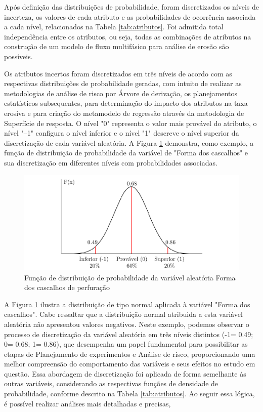 Após definição das distribuições de probabilidade, foram discretizados os níveis de incerteza, os valores de cada atributo e as probabilidades de ocorrência associada a cada nível, relacionados na Tabela \ref{tab:atributos}. Foi admitida total independência entre os atributos, ou seja, todas as combinações de atributos na construção de um modelo de fluxo multifásico para análise de erosão são possíveis.

 Os atributos incertos foram discretizados em três níveis de acordo com as respectivas distribuições de probabilidade geradas, com intuito de realizar as metodologias de análise de risco por Árvore de derivação, os planejamentos estatísticos subsequentes, para determinação do impacto dos atributos na taxa erosiva e para criação do metamodelo de regressão através da metodologia de Superfície de resposta. O nível "0" representa o valor mais provável do atributo, o nível "–1" configura o nível inferior e o nível "1" descreve o nível superior da discretização de cada variável aleatória. A Figura \ref{fig:discretizacao} demonstra, como exemplo, a função de distribuição de probabilidade da variável de "Forma dos cascalhos" e sua discretização em diferentes níveis com probabilidades associadas.

\begin{figure}[H] 
    \centering  
    \includegraphics{Figuras/discretizacao.pdf}  
    \caption{Função de distribuição de probabilidade da variável aleatória Forma dos cascalhos de perfuração}  
    \label{fig:discretizacao}  
\end{figure}

A Figura \ref{fig:discretizacao} ilustra a distribuição de tipo normal aplicada à variável "Forma dos cascalhos". Cabe ressaltar que a distribuição normal atribuida a esta variável aleatória não apresentou valores negativos. Neste exemplo, podemos observar o processo de discretização da variável aleatória em três níveis distintos (-1= 0.49; 0= 0.68; 1= 0.86), que desempenha um papel fundamental para possibilitar as etapas de Planejamento de experimentos e Análise de risco, proporcionando uma melhor compreensão do comportamento das variáveis e seus efeitos no estudo em questão. Essa abordagem de discretização foi aplicada de forma semelhante às outras variáveis, considerando as respectivas funções de densidade de probabilidade, conforme descrito na Tabela \ref{tab:atributos}. Ao seguir essa lógica, é possível realizar análises mais detalhadas e precisas, 



